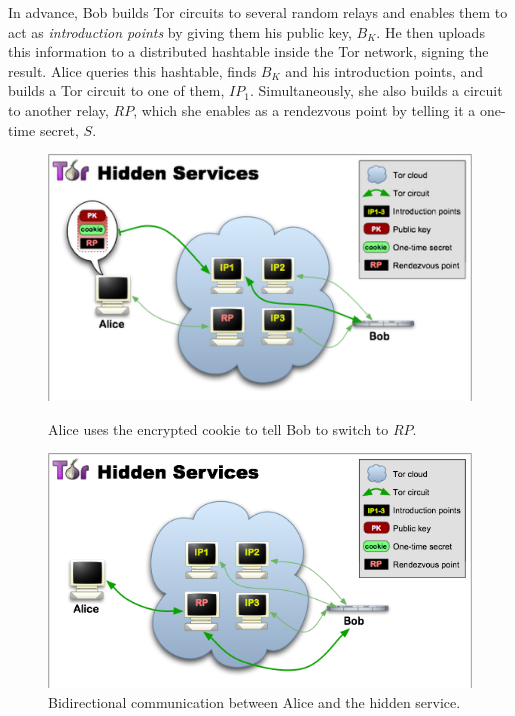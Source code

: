 In advance, Bob builds Tor circuits to several random relays and enables them to act as \textit{introduction points} by giving them his public key, $B_{K}$. He then uploads this information to a distributed hashtable inside the Tor network, signing the result. Alice queries this hashtable, finds $B_{K}$ and his introduction points, and builds a Tor circuit to one of them, $IP_{1}$. Simultaneously, she also builds a circuit to another relay, $RP$, which she enables as a rendezvous point by telling it a one-time secret, $S$.

\begin{figure}[htdp]
	\begin{minipage}[b]{0.45\linewidth}
		\centering
		\includegraphics[width=\textwidth]{images/tor-hidden-service-4-higher.png}
		\caption{Alice uses the encrypted cookie to tell Bob to switch to $RP$.}
		\label{fig:figure1}
	\end{minipage}
	\hspace{0.5cm}
	\begin{minipage}[b]{0.45\linewidth}
		\centering
		\includegraphics[width=\textwidth]{images/tor-hidden-service-6.png}
		\caption{Bidirectional communication between Alice and the hidden service.}
		\label{fig:figure2}
	\end{minipage}
\end{figure}

